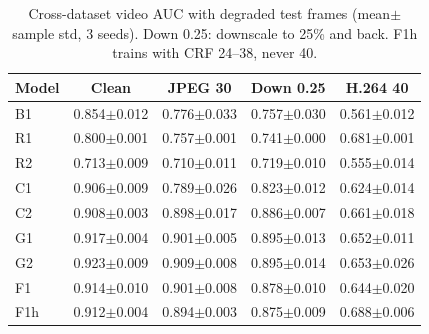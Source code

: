 \begin{table}[t]
\centering
\footnotesize
\setlength{\tabcolsep}{3pt}
\caption{Cross-dataset video AUC with degraded test frames (mean$\pm$sample std, 3 seeds). Down 0.25: downscale to 25\% and back. F1h trains with CRF 24--38, never 40.}
\label{tab:robust}
\begin{tabular}{lcccc}
\toprule
Model & Clean & JPEG 30 & Down 0.25 & H.264 40 \\
\midrule
B1 & 0.854$\pm$0.012 & 0.776$\pm$0.033 & 0.757$\pm$0.030 & 0.561$\pm$0.012 \\
R1 & 0.800$\pm$0.001 & 0.757$\pm$0.001 & 0.741$\pm$0.000 & 0.681$\pm$0.001 \\
R2 & 0.713$\pm$0.009 & 0.710$\pm$0.011 & 0.719$\pm$0.010 & 0.555$\pm$0.014 \\
\midrule
C1 & 0.906$\pm$0.009 & 0.789$\pm$0.026 & 0.823$\pm$0.012 & 0.624$\pm$0.014 \\
C2 & 0.908$\pm$0.003 & 0.898$\pm$0.017 & 0.886$\pm$0.007 & 0.661$\pm$0.018 \\
G1 & 0.917$\pm$0.004 & 0.901$\pm$0.005 & 0.895$\pm$0.013 & 0.652$\pm$0.011 \\
G2 & 0.923$\pm$0.009 & 0.909$\pm$0.008 & 0.895$\pm$0.014 & 0.653$\pm$0.026 \\
F1 & 0.914$\pm$0.010 & 0.901$\pm$0.008 & 0.878$\pm$0.010 & 0.644$\pm$0.020 \\
F1h & 0.912$\pm$0.004 & 0.894$\pm$0.003 & 0.875$\pm$0.009 & 0.688$\pm$0.006 \\
\bottomrule
\end{tabular}
\end{table}
